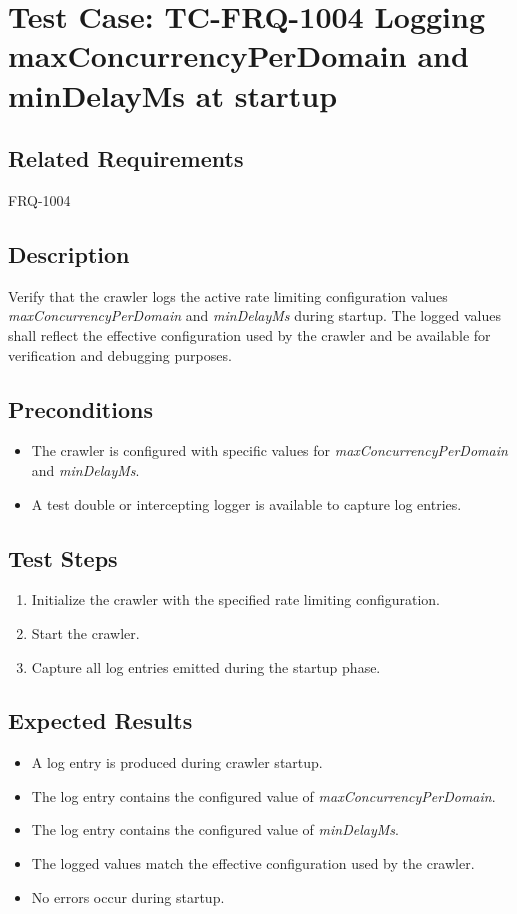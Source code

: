\documentclass{article}
\begin{document}
\section{Test Case: TC-FRQ-1004 \newline Logging maxConcurrencyPerDomain and minDelayMs at startup}

\subsection*{Related Requirements}
FRQ-1004

\subsection*{Description}
Verify that the crawler logs the active rate limiting configuration values 
\textit{maxConcurrencyPerDomain} and \textit{minDelayMs} during startup. 
The logged values shall reflect the effective configuration used by the crawler 
and be available for verification and debugging purposes.

\subsection*{Preconditions}
\begin{itemize}
  \item The crawler is configured with specific values for 
        \textit{maxConcurrencyPerDomain} and \textit{minDelayMs}.
  \item A test double or intercepting logger is available to capture log entries.
\end{itemize}

\subsection*{Test Steps}
\begin{enumerate}
  \item Initialize the crawler with the specified rate limiting configuration.
  \item Start the crawler.
  \item Capture all log entries emitted during the startup phase.
\end{enumerate}

\subsection*{Expected Results}
\begin{itemize}
  \item A log entry is produced during crawler startup.
  \item The log entry contains the configured value of \textit{maxConcurrencyPerDomain}.
  \item The log entry contains the configured value of \textit{minDelayMs}.
  \item The logged values match the effective configuration used by the crawler.
  \item No errors occur during startup.
\end{itemize}
\end{document}
